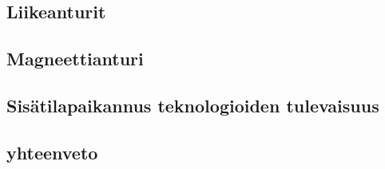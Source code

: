 \subsection{Liikeanturit}
\subsection{Magneettianturi}
\subsection{Sisätilapaikannus teknologioiden tulevaisuus}
\subsection{yhteenveto}

